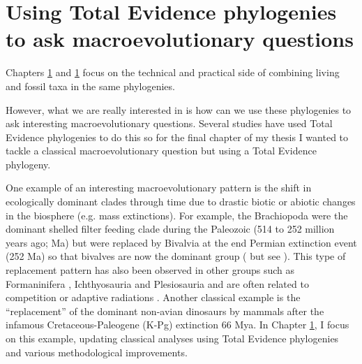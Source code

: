 
\section{Using Total Evidence phylogenies to ask macroevolutionary questions}
Chapters \ref{} and \ref{} focus on the technical and practical side of combining living and fossil taxa in the same phylogenies.



However, what we are really interested in is how can we use these phylogenies to ask interesting macroevolutionary questions.
Several studies have used Total Evidence phylogenies to do this %
so for the final chapter of my thesis I wanted to tackle a classical macroevolutionary question but using a Total Evidence phylogeny. 

One example of an interesting macroevolutionary pattern is the shift in ecologically dominant clades through time due to drastic biotic or abiotic changes in the biosphere (e.g. mass extinctions). %
For example, the Brachiopoda were the dominant shelled filter feeding clade during the Paleozoic (514 to 252 million years ago; Ma) but were replaced by Bivalvia at the end Permian extinction event (252 Ma) so that bivalves are now the dominant group (\citealt{Sepkiski1981,CLAPHAM01102006} but see \citealt{Payne22052014}).
This type of replacement pattern has also been observed in other groups such as Formaninifera \citep{Coxall01042006}, Ichthyosauria \citep{thorneresetting2011} and Plesiosauria \citealt{bensonfaunal2014} and are often related to competition \citep{brusatte50} or adaptive radiations \citep{Losos2010}.
Another classical example is the ``replacement'' of the dominant non-avian dinosaurs by mammals after the infamous Cretaceous-Paleogene (K-Pg) extinction 66 Mya.
In Chapter \ref{}, I focus on this example, updating classical analyses using Total Evidence phylogenies and various methodological improvements.

